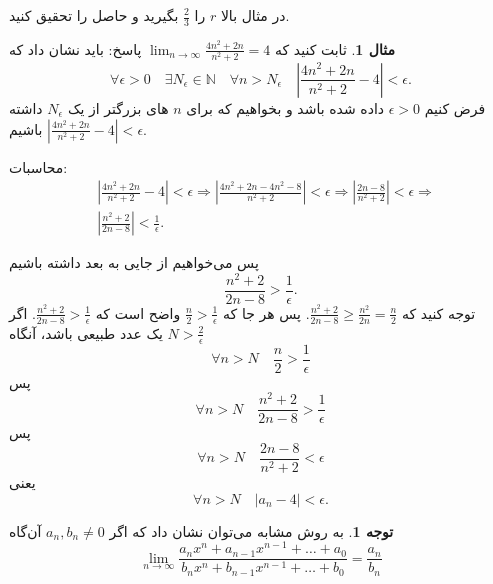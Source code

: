 \documentclass[12pt,a4paper]{article}
\theoremstyle{definition}
\newtheorem{mesal}[thm]{مثال}
\newtheorem{tav}[thm]{توجه}
\begin{document}
در مثال بالا 
$r$
را
$\frac{2}{3}$
بگیرید و حاصل را تحقیق کنید. 
\begin{mesal}
ثابت کنید که 
$\lim_{n \to \infty} \frac{4n^2+2n}{n^2+2}=4$
\newline
پاسخ:
باید نشان داد که
\[
\forall \epsilon>0 \quad \exists N_\epsilon\in \mathbb{N}
\quad \forall n>N_\epsilon \quad |\frac{4n^2+2n}{n^2+2}-4|<\epsilon.
\]
فرض کنیم 
$\epsilon >0$
داده شده باشد و بخواهیم که برای
$n$
های بزرگتر از
یک
$N_\epsilon$
داشته باشیم
$|\frac{4n^2+2n}{n^2+2}-4|<\epsilon$.
\begin{framed}
محاسبات: 
\begin{align*}
& |\frac{4n^2+2n}{n^2+2}-4|<\epsilon\Rightarrow |\frac{4n^2+2n-4n^2-8}{n^2+2}|<\epsilon\Rightarrow |\frac{2n-8}{n^2+2}|<\epsilon\Rightarrow\\
& |\frac{n^2+2}{2n-8}|<\frac{1}{\epsilon}.
\end{align*}
\end{framed}
پس می‌خواهیم از جایی به بعد داشته باشیم
\[
\frac{n^2+2}{2n-8}>\frac{1}{\epsilon}.
\]
توجه کنید که
$\frac{n^2+2}{2n-8}\geq \frac{n^2}{2n}=\frac{n}{2}$.
پس هر جا که
$\frac{n}{2}>\frac{1}{\epsilon}$
واضح است که 
$\frac{n^2+2}{2n-8}>\frac{1}{\epsilon}$.
اگر
$N>\frac{2}{\epsilon}$
یک عدد طبیعی باشد، آنگاه 
\[
\forall n>N \quad \frac{n}{2}>\frac{1}{\epsilon}
\]
پس
\[
\forall n>N \quad \frac{n^2+2}{2n-8}>\frac{1}{\epsilon}
\]
پس
\[
\forall n>N \quad \frac{2n-8}{n^2+2}<\epsilon
\]
یعنی
\[
\forall n>N \quad |a_n-4|<\epsilon.
\]
\end{mesal}
\begin{tav}
به روش مشابه می‌توان نشان داد که
اگر
$a_n,b_n\not=0$
آن‌گاه
\[
\lim_{n\to \infty}\frac{a_nx^n+a_{n-1}x^{n-1}+\ldots+a_0}{b_nx^n+b_{n-1}x^{n-1}+\ldots+b_0}=\frac{a_n}{b_n}
\]
\end{tav}
\end{document}

